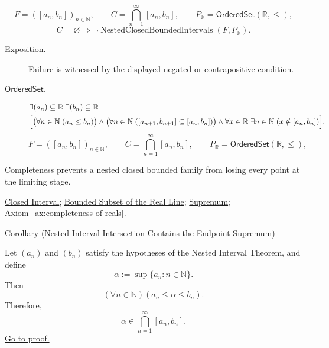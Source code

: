\begin{remark*}
\[
F=([a_n,b_n])_{n\in\mathbb{N}},\qquad C=\bigcap_{n=1}^{\infty}[a_n,b_n],\qquad
P_{\mathbb{R}}=\mathsf{OrderedSet}(\mathbb{R},\leq),
\]
\[
C=\varnothing
\Longrightarrow
\neg\operatorname{NestedClosedBoundedIntervals}(F,P_{\mathbb{R}}).
\]
\end{remark*}

\begin{remark*}
\begin{description}
  \item[Exposition.]
  Failure is witnessed by the displayed negated or contrapositive condition.

  \item[\(\mathsf{OrderedSet}.\)]
  \[
\begin{aligned}
&\exists (a_n)\subseteq\mathbb{R}\;\exists (b_n)\subseteq\mathbb{R}\;\\
&\Bigl[
\bigl(\forall n\in\mathbb{N}\;(a_n\le b_n)\bigr)
\land
\bigl(\forall n\in\mathbb{N}\;([a_{n+1},b_{n+1}]\subseteq [a_n,b_n])\bigr)
\land
\forall x\in\mathbb{R}\;\exists n\in\mathbb{N}\;(x\notin [a_n,b_n])
\Bigr].
\end{aligned}
\]
\[
F=([a_n,b_n])_{n\in\mathbb{N}},\qquad C=\bigcap_{n=1}^{\infty}[a_n,b_n],\qquad
P_{\mathbb{R}}=\mathsf{OrderedSet}(\mathbb{R},\leq),
\]
\end{description}
\end{remark*}

\begin{remark*}[Interpretation]
Completeness prevents a nested closed bounded family from losing every point
at the limiting stage.
\end{remark*}

\begin{dependencies}
\hyperref[def:closed-interval]{Closed Interval};
\hyperref[def:bounded-subset-of-r]{Bounded Subset of the Real Line};
\hyperref[def:supremum]{Supremum};
\hyperref[ax:completeness-of-reals]{Axiom~\ref*{ax:completeness-of-reals}}.
\end{dependencies}

\begin{corollarybox}{Corollary (Nested Interval Intersection Contains the Endpoint Supremum)}
\begin{corollary}
\label{cor:nested-interval-intersection-contains-endpoint-supremum}
Let $(a_n)$ and $(b_n)$ satisfy the hypotheses of the Nested Interval Theorem,
and define
\[
  \alpha:=\sup\{a_n:n\in\mathbb{N}\}.
\]
Then
\[
  (\forall n\in\mathbb{N})(a_n\leq\alpha\leq b_n).
\]
Therefore,
\[
  \alpha\in \bigcap_{n=1}^{\infty}[a_n,b_n].
\]
\hyperref[prf:nested-interval-intersection-contains-endpoint-supremum]{Go to proof.}
\end{corollary}
\end{corollarybox}

